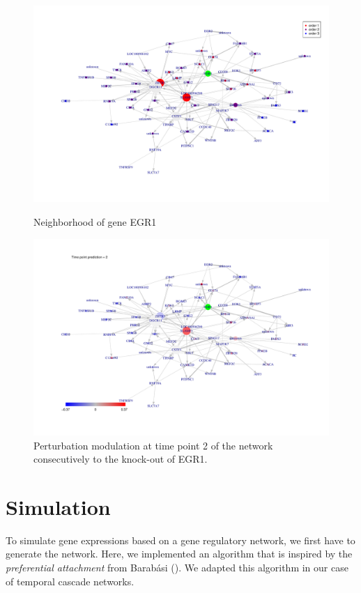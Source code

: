 \documentclass[a4paper]{article}
\begin{document}
\begin{figure}
\centering
\includegraphics[clip=true,trim= 2cm 3cm 1mm 1cm,angle=0,width=17cm]{Cascade-fig7}
\caption{Neighborhood of gene EGR1} \label{neig}
\includegraphics[clip=true,trim= 2cm 3cm 1mm 1cm,angle=0,width=17cm]{Cascade-fig8}
\caption{Perturbation modulation at time point 2 of the network consecutively to the knock-out of EGR1.} \label{pred}
\end{figure}
    

        

\section{Simulation}

To simulate gene expressions based on a gene regulatory network, we first have to generate the network. Here, we implemented an algorithm that is inspired by the \textit{preferential attachment} from Barab\'asi (\cite{barabasi2002emergence,jeong2007measuring}). We adapted this algorithm in our case of temporal cascade networks. \\
\end{document}
